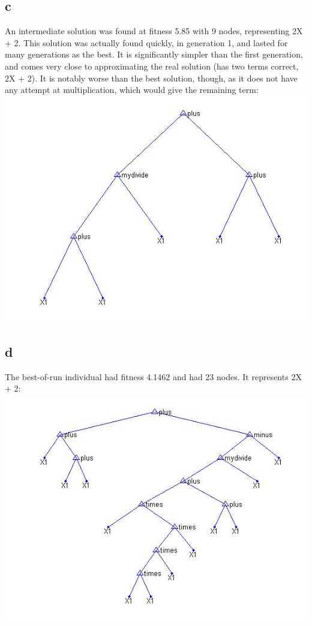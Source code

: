 \documentclass[12pt]{article}
\begin{document}
\subsection{c}
An intermediate solution was found at fitness 5.85 with 9 nodes, representing 2X + 2. This solution was actually found quickly, in generation 1, and lasted for many generations as the best. It is significantly simpler than the first generation, and comes very close to approximating the real solution (has two terms correct, 2X + 2). It is notably worse than the best solution, though, as it does not have any attempt at multiplication, which would give the remaining term:\\
\includegraphics[scale=0.5]{intermediate}

\subsection{d}
The best-of-run individual had fitness 4.1462 and had 23 nodes. It represents 2X + 2:\\
\includegraphics[scale=0.5]{best}
\end{document}

